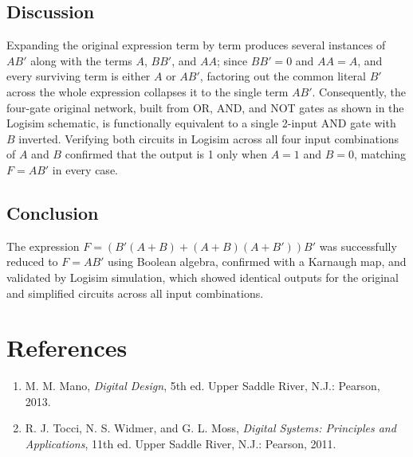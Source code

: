 \documentclass[12pt]{article}
\begin{document}
\subsection*{Discussion}
Expanding the original expression term by term produces several instances of $AB'$ along with the terms $A$, $BB'$, and $AA$; since $BB' = 0$ and $AA = A$, and every surviving term is either $A$ or $AB'$, factoring out the common literal $B'$ across the whole expression collapses it to the single term $AB'$. Consequently, the four-gate original network, built from OR, AND, and NOT gates as shown in the Logisim schematic, is functionally equivalent to a single 2-input AND gate with $B$ inverted. Verifying both circuits in Logisim across all four input combinations of $A$ and $B$ confirmed that the output is 1 only when $A=1$ and $B=0$, matching $F = AB'$ in every case.

\subsection*{Conclusion}
The expression $F = (B'(A+B) + (A+B)(A+B'))B'$ was successfully reduced to $F = AB'$ using Boolean algebra, confirmed with a Karnaugh map, and validated by Logisim simulation, which showed identical outputs for the original and simplified circuits across all input combinations.

\vspace{1cm}

\section*{References}
\begin{enumerate}[leftmargin=*]
    \item M. M. Mano, \textit{Digital Design}, 5th ed. Upper Saddle River, N.J.: Pearson, 2013.
    \item R. J. Tocci, N. S. Widmer, and G. L. Moss, \textit{Digital Systems: Principles and Applications}, 11th ed. Upper Saddle River, N.J.: Pearson, 2011.
\end{enumerate}
\end{document}
